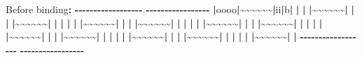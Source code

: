\documentclass[
  a4paper,
  twoside,
  openright]{book}
\newenvironment{Shaded}{\begin{snugshade}}{\end{snugshade}}
\newcommand{\ErrorTok}[1]{\textcolor[rgb]{0.64,0.00,0.00}{\textbf{#1}}}
\newcommand{\NormalTok}[1]{#1}
\newcommand{\SpecialCharTok}[1]{\textcolor[rgb]{0.81,0.36,0.00}{\textbf{#1}}}
\theoremstyle{definition}
\theoremstyle{definition}
\theoremstyle{definition}
\theoremstyle{definition}
\theoremstyle{remark}
\begin{document}
\begin{itemize}
\begin{itemize}
\begin{Shaded}
\begin{Highlighting}[]
\NormalTok{Before binding}\SpecialCharTok{:}
\SpecialCharTok{{-}{-}{-}{-}{-}{-}{-}{-}{-}{-}{-}{-}{-}{-}{-}{-}{-}{-}}    \SpecialCharTok{{-}{-}{-}{-}{-}{-}{-}{-}{-}{-}{-}{-}{-}{-}{-}{-}{-}}
\ErrorTok{|}\NormalTok{oooo}\SpecialCharTok{|}\ErrorTok{\textasciitilde{}\textasciitilde{}\textasciitilde{}\textasciitilde{}\textasciitilde{}\textasciitilde{}|}\NormalTok{ii}\SpecialCharTok{|}\NormalTok{b}\SpecialCharTok{|}    \ErrorTok{|} \ErrorTok{|}  \ErrorTok{|\textasciitilde{}\textasciitilde{}\textasciitilde{}\textasciitilde{}\textasciitilde{}\textasciitilde{}|}   \ErrorTok{|}
\ErrorTok{|}    \ErrorTok{|\textasciitilde{}\textasciitilde{}\textasciitilde{}\textasciitilde{}\textasciitilde{}\textasciitilde{}|}  \ErrorTok{|} \ErrorTok{|}    \ErrorTok{|} \ErrorTok{|}  \ErrorTok{|\textasciitilde{}\textasciitilde{}\textasciitilde{}\textasciitilde{}\textasciitilde{}\textasciitilde{}|}   \ErrorTok{|}
\ErrorTok{|}    \ErrorTok{|\textasciitilde{}\textasciitilde{}\textasciitilde{}\textasciitilde{}\textasciitilde{}\textasciitilde{}|}  \ErrorTok{|} \ErrorTok{|}    \ErrorTok{|} \ErrorTok{|}  \ErrorTok{|\textasciitilde{}\textasciitilde{}\textasciitilde{}\textasciitilde{}\textasciitilde{}\textasciitilde{}|}   \ErrorTok{|}
\ErrorTok{|}    \ErrorTok{|\textasciitilde{}\textasciitilde{}\textasciitilde{}\textasciitilde{}\textasciitilde{}\textasciitilde{}|}  \ErrorTok{|} \ErrorTok{|}    \ErrorTok{|} \ErrorTok{|}  \ErrorTok{|\textasciitilde{}\textasciitilde{}\textasciitilde{}\textasciitilde{}\textasciitilde{}\textasciitilde{}|}   \ErrorTok{|}
\ErrorTok{|}    \ErrorTok{|\textasciitilde{}\textasciitilde{}\textasciitilde{}\textasciitilde{}\textasciitilde{}\textasciitilde{}|}  \ErrorTok{|} \ErrorTok{|}    \ErrorTok{|} \ErrorTok{|}  \ErrorTok{|\textasciitilde{}\textasciitilde{}\textasciitilde{}\textasciitilde{}\textasciitilde{}\textasciitilde{}|}   \ErrorTok{|}
\ErrorTok{|}    \ErrorTok{|\textasciitilde{}\textasciitilde{}\textasciitilde{}\textasciitilde{}\textasciitilde{}\textasciitilde{}|}  \ErrorTok{|} \ErrorTok{|}    \ErrorTok{|} \ErrorTok{|}  \ErrorTok{|\textasciitilde{}\textasciitilde{}\textasciitilde{}\textasciitilde{}\textasciitilde{}\textasciitilde{}|}   \ErrorTok{|}
\SpecialCharTok{{-}{-}{-}{-}{-}{-}{-}{-}{-}{-}{-}{-}{-}{-}{-}{-}{-}{-}}    \SpecialCharTok{{-}{-}{-}{-}{-}{-}{-}{-}{-}{-}{-}{-}{-}{-}{-}{-}{-}}


\end{Highlighting}
\end{Shaded}
\end{itemize}
\end{itemize}
\end{document}
